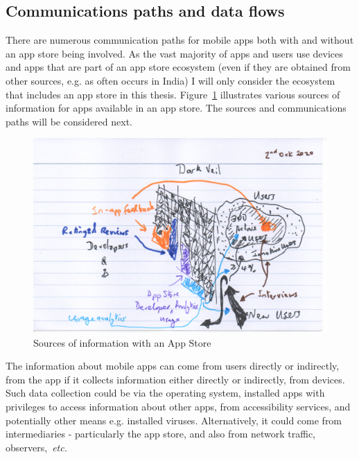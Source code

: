 \subsection{Communications paths and data flows}
There are numerous communication paths for mobile apps both with and without an app store being involved. As the vast majority of apps and users use devices and apps that are part of an app store ecosystem (even if they are obtained from other sources, e.g. as often occurs in India) I will only consider the ecosystem that includes an app store in this thesis. Figure~\ref{fig:sources-of-info-with-app-store-background-ch} illustrates various sources of information for apps available in an app store. The sources and communications paths will be considered next. 

\begin{figure}[htbp!]
    \centering
    \includegraphics[width=13cm]{images/rough-sketches/sources-of-information-with-app-store-1.png}
    \caption{Sources of information with an App Store}
    \label{fig:sources-of-info-with-app-store-background-ch}
\end{figure}

The information about mobile apps can come from users directly or indirectly, from the app if it collects information either directly or indirectly, from devices. Such data collection could be via the operating system, installed apps with privileges to access information about other apps, from accessibility services, and potentially other means e.g. installed viruses. Alternatively, it could come from intermediaries - particularly the app store, and also from network traffic, observers,~\emph{etc.} 

